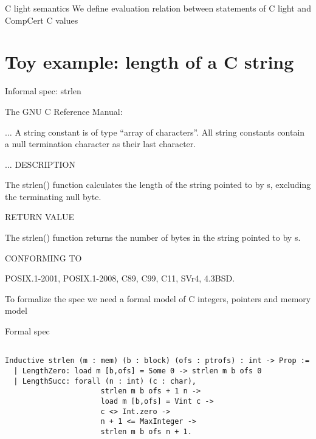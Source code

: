 \documentclass{beamer}
\begin{document}
  
\begin{frame}{C light semantics}
We define evaluation relation between statements of C light and CompCert C values 
\end{frame}


\section{Toy example: length of a C string}

\begin{frame}{Informal spec: strlen}

  The GNU C Reference Manual:
 \bigskip


  $\ldots$ A string constant is of type ``array of characters''. All string constants contain a null termination character as their last character.

\bigskip

$\ldots$
DESCRIPTION        

 The strlen() function calculates the length of the string pointed to
 by s, excluding the terminating null byte.

 \bigskip

RETURN VALUE 

 The strlen() function returns the number of bytes in the string
 pointed to by s.

 \bigskip

CONFORMING TO 

 POSIX.1-2001, POSIX.1-2008, C89, C99, C11, SVr4, 4.3BSD.



\end{frame}

\begin{frame}
 To formalize the spec we need a formal model of C integers, pointers and memory model
\end{frame}

\begin{frame}[t,fragile]{Formal spec}

  \begin{lstlisting}[language=Coq]
    
Inductive strlen (m : mem) (b : block) (ofs : ptrofs) : int -> Prop :=
  | LengthZero: load m [b,ofs] = Some 0 -> strlen m b ofs 0
  | LengthSucc: forall (n : int) (c : char),
                      strlen m b ofs + 1 n ->
                      load m [b,ofs] = Vint c ->
                      c <> Int.zero ->
                      n + 1 <= MaxInteger ->
                      strlen m b ofs n + 1.
  \end{lstlisting}
  
  
  
      
\end{frame}
\end{document}
